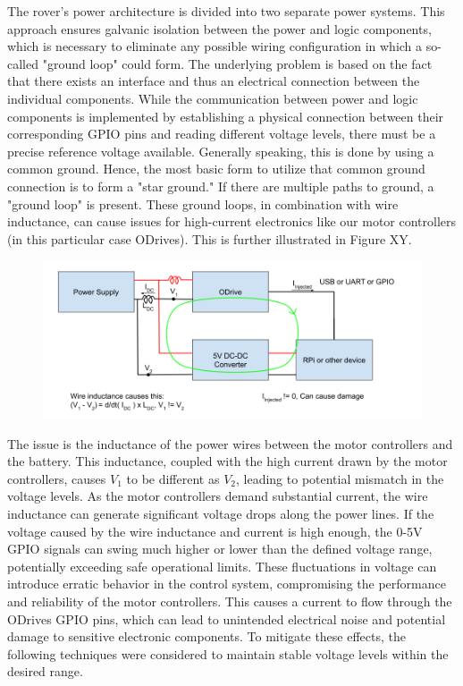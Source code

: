 The rover's power architecture is divided into two separate power systems. This approach ensures galvanic isolation between the power and logic components, which is necessary to eliminate any possible wiring configuration in which a so-called "ground loop" could form. The underlying problem is based on the fact that there exists an interface and thus an electrical connection between the individual components. While the communication between power and logic components is implemented by establishing a physical connection between their corresponding GPIO pins and reading different voltage levels, there must be a precise reference voltage available. Generally speaking, this is done by using a common ground. Hence, the most basic form to utilize that common ground connection is to form a "star ground." If there are multiple paths to ground, a "ground loop" is present. These ground loops, in combination with wire inductance, can cause issues for high-current electronics like our motor controllers (in this particular case ODrives). This is further illustrated in Figure XY.

\begin{figure}[h]
\includegraphics[width=\textwidth]{contents/figures/ground_loop_bad.png}
\end{figure}

The issue is the inductance of the power wires between the motor controllers and the battery. This inductance, coupled with the high current drawn by the motor controllers, causes $V_1$ to be different as $V_2$, leading to potential mismatch in the voltage levels. As the motor controllers demand substantial current, the wire inductance can generate significant voltage drops along the power lines. If the voltage caused by the wire inductance and current is high enough, the 0-5V GPIO signals can swing much higher or lower than the defined voltage range, potentially exceeding safe operational limits. These fluctuations in voltage can introduce erratic behavior in the control system, compromising the performance and reliability of the motor controllers. This causes a current to flow through the ODrives GPIO pins, which can lead to unintended electrical noise and potential damage to sensitive electronic components. To mitigate these effects, the following techniques were considered to maintain stable voltage levels within the desired range.

